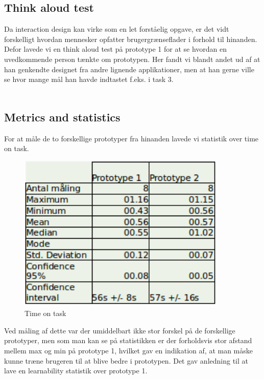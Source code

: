 \subsection*{Think aloud test}
Da interaction design kan virke som en let forståelig opgave, er det vidt forskelligt hvordan mennesker opfatter brugergrænseflader i forhold til hinanden. Defor lavede vi en think aloud test på prototype 1 for at se hvordan en uvedkommende person tænkte om prototypen. Her fandt vi blandt andet ud af at han genkendte designet fra andre lignende applikationer, men at han gerne ville se hvor mange mål han havde indtastet f.eks. i task 3.\\\\ 

\subsection*{Metrics and statistics}
For at måle de to forskellige prototyper fra hinanden lavede vi statistik over time on task. 
\begin{figure}[ht!]
\centering
\includegraphics[width=100mm]{images/timeontask}
\caption{Time on task}
\end{figure}
Ved måling af dette var der umiddelbart ikke stor forskel på de forskellige prototyper, men som man kan se på statistikken er der forholdsvis stor afstand mellem max og min på prototype 1, hvilket gav en indikation af, at man måske kunne træne brugeren til at blive bedre i prototypen. Det gav anledning til at lave en learnability statistik over prototype 1.\\\\

